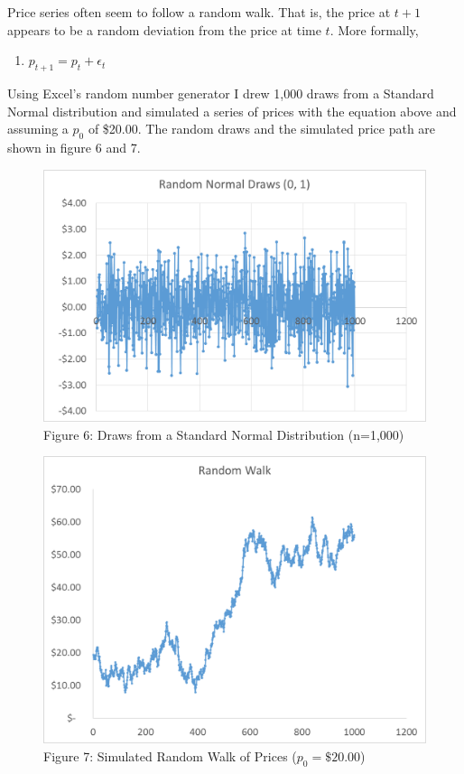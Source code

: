 \documentclass[]{book}
\providecommand{\tightlist}{%
  \setlength{\itemsep}{0pt}\setlength{\parskip}{0pt}}
\theoremstyle{definition}
\theoremstyle{definition}
\theoremstyle{remark}
\begin{document}
Price series often seem to follow a random walk. That is, the price at
\(t+1\) appears to be a random deviation from the price at time \(t\).
More formally,

\begin{enumerate}
\def\labelenumi{(\arabic{enumi})}
\setcounter{enumi}{2}
\tightlist
\item
  \(p_{t+1} = p_{t} + \epsilon_t\)
\end{enumerate}

Using Excel's random number generator I drew 1,000 draws from a Standard
Normal distribution and simulated a series of prices with the equation
above and assuming a \(p_0\) of \$20.00. The random draws and the
simulated price path are shown in figure 6 and 7.

\begin{figure}[htbp]
\centering
\includegraphics{Excel-files/IntroductiontoCommodityTS-random_walk_files/image003.png}
\caption{Figure 6: Draws from a Standard Normal Distribution (n=1,000)}
\end{figure}

\begin{figure}[htbp]
\centering
\includegraphics{Excel-files/IntroductiontoCommodityTS-random_walk_files/image001.png}
\caption{Figure 7: Simulated Random Walk of Prices (\(p_0 = \$20.00\))}
\end{figure}
\end{document}
